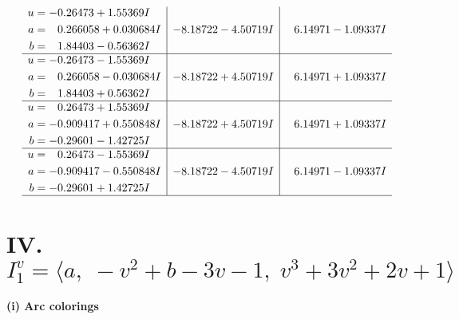 \documentclass[1p]{elsarticle_modified}
\theoremstyle{definition}
\begin{document}
$$\begin{array}{c|c|c}
\begin{aligned}
u &= -0.26473 + 1.55369 I \\
a &= \phantom{-}0.266058 + 0.030684 I \\
b &= \phantom{-}1.84403 - 0.56362 I\end{aligned}
 & -8.18722 - 4.50719 I & \phantom{-}6.14971 - 1.09337 I \\ \hline\begin{aligned}
u &= -0.26473 - 1.55369 I \\
a &= \phantom{-}0.266058 - 0.030684 I \\
b &= \phantom{-}1.84403 + 0.56362 I\end{aligned}
 & -8.18722 + 4.50719 I & \phantom{-}6.14971 + 1.09337 I \\ \hline\begin{aligned}
u &= \phantom{-}0.26473 + 1.55369 I \\
a &= -0.909417 + 0.550848 I \\
b &= -0.29601 - 1.42725 I\end{aligned}
 & -8.18722 + 4.50719 I & \phantom{-}6.14971 + 1.09337 I \\ \hline\begin{aligned}
u &= \phantom{-}0.26473 - 1.55369 I \\
a &= -0.909417 - 0.550848 I \\
b &= -0.29601 + 1.42725 I\end{aligned}
 & -8.18722 - 4.50719 I & \phantom{-}6.14971 - 1.09337 I\\
 \hline 
 \end{array}$$\newpage\newpage\renewcommand{\arraystretch}{1}
\centering \section*{IV. $I^v_{1}= \langle a,\;- v^2+b-3 v-1,\;v^3+3 v^2+2 v+1 \rangle$}
\flushleft \textbf{(i) Arc colorings}\\
\end{document}
